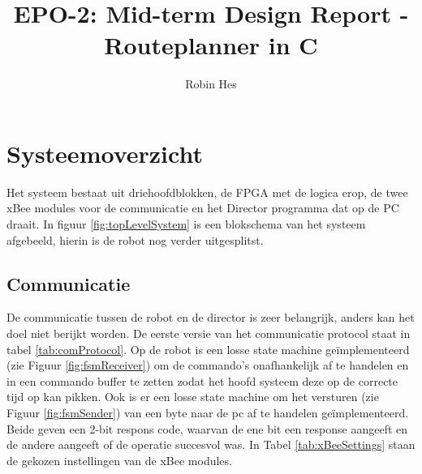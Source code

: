 \documentclass{report}
\title{EPO-2: Mid-term Design Report - Routeplanner in C}
\author{Robin Hes}
\begin{document}
\chapter{Systeemoverzicht}
Het systeem bestaat uit driehoofdblokken, de FPGA met de logica erop, de twee xBee modules voor de communicatie en het Director programma dat op de PC draait. In figuur \ref{fig:topLevelSystem} is een blokschema van het systeem afgebeeld, hierin is de robot nog verder uitgesplitst. 
\section{Communicatie}
De communicatie tussen de robot en de director is zeer belangrijk, anders kan het doel niet berijkt worden.
De eerste versie van het communicatie protocol staat in tabel \ref{tab:comProtocol}.
Op de robot is een losse state machine geïmplementeerd (zie Figuur \ref{fig:fsmReceiver}) om de commando's onafhankelijk af te handelen en in een commando buffer te zetten zodat het hoofd systeem deze op de correcte tijd op kan pikken.
Ook is er een losse state machine om het versturen (zie Figuur \ref{fig:fsmSender}) van een byte naar de pc af te handelen geïmplementeerd.
Beide geven een 2-bit respons code, waarvan de ene bit een response aangeeft en de andere aangeeft of de operatie succesvol was.
In Tabel \ref{tab:xBeeSettings} staan de gekozen instellingen van de xBee modules.
\end{document}
